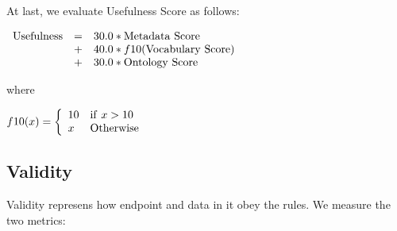 \documentclass[11pt,a4paper]{article}
\begin{document}
At last, we evaluate Usefulness Score as follows:

\begin{mdframed}
  \center
  $\begin{array}{lll}
  {\rm Usefulness} & = & 30.0 * {\rm Metadata~Score} \\
                   & + & 40.0 * f10({\rm Vocabulary~Score}) \\
                   & + & 30.0 * {\rm Ontology~Score}
  \end{array}$

  where

  $f10(x) = \left\{
    \begin{array}{ll}
      10 & {\rm if}~x>10 \\
      x  & {\rm Otherwise}
    \end{array}
  \right.$
\end{mdframed}

\subsection{Validity}

  Validity represens how endpoint and data in it obey the rules.
  We measure the two metrics:
\end{document}
